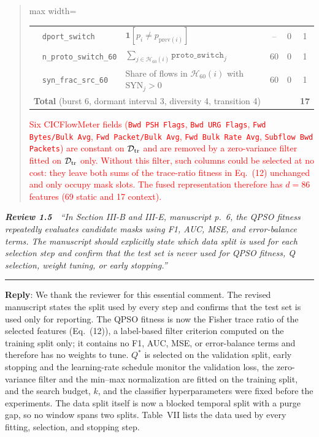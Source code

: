 \documentclass[11pt]{article}
\newenvironment{excerpt}{\begin{quote}\sloppy}{\end{quote}}
\newcommand{\review}[2]{\par\bigskip\noindent\textbf{\textit{Review #1}}\ \ \textit{``#2''}\par\smallskip\hrule\medskip}
\newcommand{\reply}{\noindent\textbf{Reply}: }
\begin{document}
\begin{excerpt}
\begin{table}[H]
\begin{adjustbox}{max width=\linewidth}
\begin{tabular}{l l >{\raggedright\arraybackslash}p{4.3cm} c c c}
 & \texttt{dport\_switch}       & $\mathbf{1}[p_i\neq p_{\mathrm{prev}(i)}]$ & -- & 0 & 1 \\
 & \texttt{n\_proto\_switch\_60} & $\sum_{j\in\mathcal{H}_{60}(i)} \texttt{proto\_switch}_j$ & 60 & 0 & 1 \\
 & \texttt{syn\_frac\_src\_60}  & Share of flows in $\mathcal{H}_{60}(i)$ with $\mathrm{SYN}_j>0$ & 60 & 0 & 1 \\
\midrule
\multicolumn{5}{l}{\textbf{Total} (burst 6, dormant interval 3, diversity 4, transition 4)} & \textbf{17} \\
\hline\toprule
\end{tabular}
\end{adjustbox}
\end{table}

\textcolor{red}{Six CICFlowMeter fields (\texttt{Bwd PSH Flags},
\texttt{Bwd URG Flags}, \texttt{Fwd Bytes/Bulk Avg},
\texttt{Fwd Packet/Bulk Avg}, \texttt{Fwd Bulk Rate Avg},
\texttt{Subflow Bwd Packets}) are constant on $\mathcal{D}_{\rm tr}$
and are removed by a zero-variance filter fitted on
$\mathcal{D}_{\rm tr}$ only. Without this filter, such columns could
be selected at no cost: they leave both sums of the trace-ratio
fitness in Eq.~(12) unchanged and only occupy mask slots.}
\textcolor{black}{\textcolor{red}{The fused representation therefore has
$d=86$ features (69 static and 17 context).}}
\end{excerpt}

\review{1.5}{In Section III-B and III-E, manuscript p.~6, the QPSO fitness repeatedly evaluates candidate masks using F1, AUC, MSE, and error-balance terms. The manuscript should explicitly state which data split is used for each selection step and confirm that the test set is never used for QPSO fitness, Q selection, weight tuning, or early stopping.}

\reply We thank the reviewer for this essential comment. The revised
manuscript states the split used by every step and confirms that the test
set is used only for reporting. The QPSO fitness is now the Fisher trace
ratio of the selected features (Eq.~(12)), a label-based filter criterion
computed on the training split only; it contains no F1, AUC, MSE, or
error-balance terms and therefore has no weights to tune. $Q^{*}$ is
selected on the validation split, early stopping and the learning-rate
schedule monitor the validation loss, the zero-variance filter and the
min--max normalization are fitted on the training split, and the search
budget, $k$, and the classifier hyperparameters were fixed before the
experiments. The data split itself is now a blocked temporal split with a
purge gap, so no window spans two splits. Table~VII lists the data used by
every fitting, selection, and stopping step.
\end{document}
